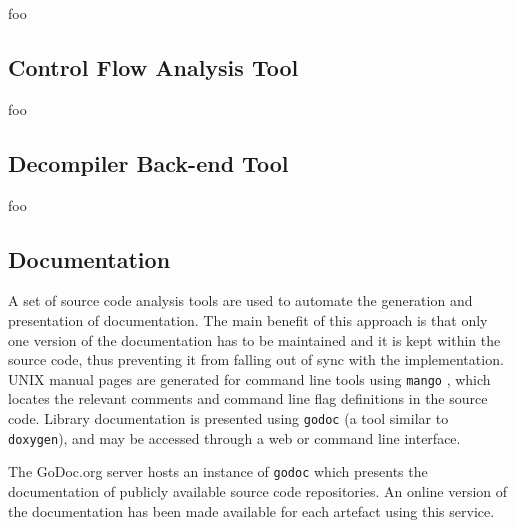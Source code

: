 foo



\subsection{Control Flow Analysis Tool}

foo


\subsection{Decompiler Back-end Tool}

foo


\subsection{Documentation}

A set of source code analysis tools are used to automate the generation and presentation of documentation. The main benefit of this approach is that only one version of the documentation has to be maintained and it is kept within the source code, thus preventing it from falling out of sync with the implementation. UNIX manual pages are generated for command line tools using \texttt{mango} \cite{mango}, which locates the relevant comments and command line flag definitions in the source code. Library documentation is presented using \texttt{godoc} \cite{godoc} (a tool similar to \texttt{doxygen}), and may be accessed through a web or command line interface.

The GoDoc.org server hosts an instance of \texttt{godoc} which presents the documentation of publicly available source code repositories. An online version of the documentation has been made available for each artefact using this service.

